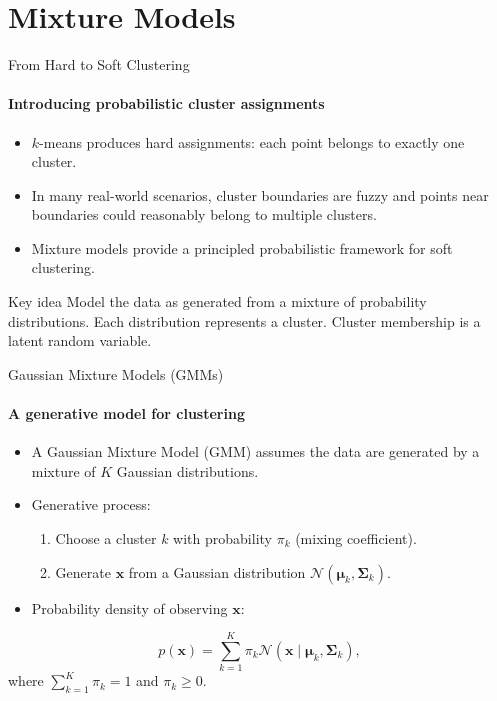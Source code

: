 \section{Mixture Models}

\begin{frame}{From Hard to Soft Clustering}
  \framesubtitle{Introducing probabilistic cluster assignments}
  \begin{itemize}
    \item $k$-means produces \alert{hard assignments}: each point belongs to exactly one cluster.
    \item In many real-world scenarios, cluster boundaries are \alert{fuzzy} and points near
          boundaries could reasonably belong to multiple clusters.
    \item \alert{Mixture models} provide a principled probabilistic framework for
          \alert{soft clustering}.
  \end{itemize}
  \begin{block}{Key idea}
    Model the data as generated from a \alert{mixture} of probability distributions.
    Each distribution represents a cluster. Cluster membership is a latent random variable.
  \end{block}
\end{frame}

\begin{frame}{Gaussian Mixture Models (GMMs)}
  \framesubtitle{A generative model for clustering}
  \begin{itemize}
    \item A \alert{Gaussian Mixture Model} (GMM) assumes the data are generated by a
          mixture of $K$ Gaussian distributions.
    \item Generative process:
      \begin{enumerate}
        \item Choose a cluster $k$ with probability $\pi_k$ (mixing coefficient).
        \item Generate $\mathbf{x}$ from a Gaussian distribution $\mathcal{N}(\boldsymbol{\mu}_k,
              \boldsymbol{\Sigma}_k)$.
      \end{enumerate}
    \item Probability density of observing $\mathbf{x}$:
  \end{itemize}
  \[
  p(\mathbf{x}) = \sum_{k=1}^{K} \pi_k \mathcal{N}(\mathbf{x} \mid \boldsymbol{\mu}_k,
                  \boldsymbol{\Sigma}_k),
  \]
  where $\sum_{k=1}^{K}\pi_k = 1$ and $\pi_k \geq 0$.
\end{frame}


